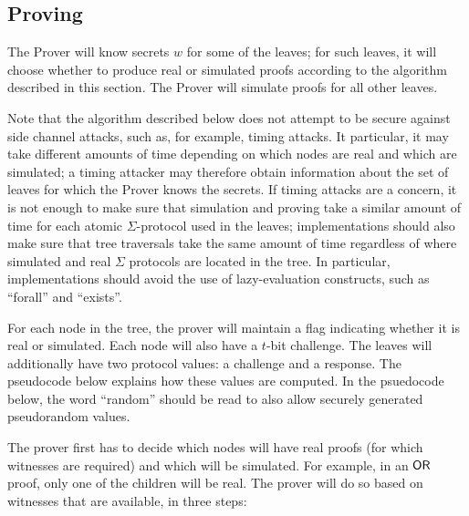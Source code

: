 \documentclass[11pt]{llncs}
\begin{document}
\subsection{Proving}
\label{sec:proving}

The Prover will know secrets $w$ for some of the leaves; for such leaves, it will choose whether to produce real or simulated proofs according to the algorithm described in this section. The Prover will simulate proofs for all other leaves. 

Note that the algorithm described below does not attempt to be secure against side channel attacks, such as, for example, timing attacks. It particular, it may take different amounts of time depending on which nodes are real and which are simulated; a timing attacker may therefore obtain information about the set of leaves for which the Prover knows the secrets. If timing attacks are a concern, it is not enough to make sure that simulation and proving take a similar amount of time for each atomic $\Sigma$-protocol used in the leaves; implementations should also make sure that tree traversals take the same amount of time regardless of where simulated and real $\Sigma$ protocols are located in the tree. In particular, implementations should avoid the use of lazy-evaluation constructs, such as ``forall'' and ``exists''.


For each node in the tree, the prover will maintain a flag indicating whether it is real or simulated. Each node will also have a $t$-bit challenge. The leaves will additionally have two protocol values: a challenge and a response. The pseudocode below explains how these values are computed. In the psuedocode below, the word ``random'' should be read to also allow securely generated pseudorandom values.

The prover first has to decide which nodes will have real proofs (for which witnesses are required) and which will be simulated. For example, in an $\mathsf{OR}$ proof, only one of the children will be real. The prover will do so based on witnesses that are available, in three steps:
\end{document}

